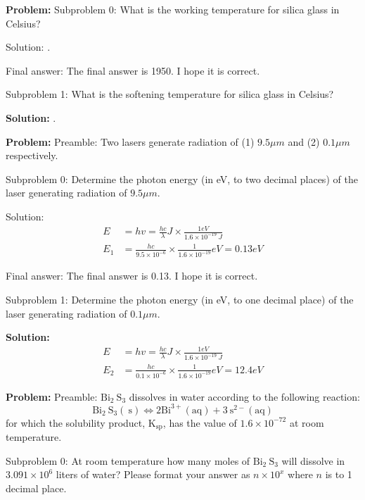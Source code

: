 \documentclass[10pt]{article}
\begin{document}
\textbf{Problem:}
Subproblem 0: What is the working temperature for silica glass in Celsius?


Solution: .

Final answer: The final answer is 1950. I hope it is correct.

Subproblem 1: What is the softening temperature for silica glass in Celsius?


\textbf{Solution:}
.


\textbf{Problem:}
Preamble: Two lasers generate radiation of (1) $9.5 \mu {m}$ and (2) $0.1 \mu {m}$ respectively.

Subproblem 0: Determine the photon energy (in eV, to two decimal places) of the laser generating radiation of $9.5 \mu {m}$.


Solution: \[
\begin{aligned}
{E} &={h} v=\frac{{hc}}{\lambda} {J} \times \frac{1 {eV}}{1.6 \times 10^{-19} {~J}} \\
{E}_{1} &=\frac{{hc}}{9.5 \times 10^{-6}} \times \frac{1}{1.6 \times 10^{-19}} {eV}= \boxed{0.13} {eV}
\end{aligned}
\]

Final answer: The final answer is 0.13. I hope it is correct.

Subproblem 1: Determine the photon energy (in eV, to one decimal place) of the laser generating radiation of $0.1 \mu {m}$. 


\textbf{Solution:}
\[
\begin{aligned}
{E} &={h} v=\frac{{hc}}{\lambda} {J} \times \frac{1 {eV}}{1.6 \times 10^{-19} {~J}} \\
{E}_{2} &=\frac{{hc}}{0.1 \times 10^{-6}} \times \frac{1}{1.6 \times 10^{-19}} {eV}= \boxed{12.4} {eV}
\end{aligned}
\]


\textbf{Problem:}
Preamble: $\mathrm{Bi}_{2} \mathrm{~S}_{3}$ dissolves in water according to the following reaction:
\[
\mathrm{Bi}_{2} \mathrm{~S}_{3}(\mathrm{~s}) \Leftrightarrow 2 \mathrm{Bi}^{3+}(\mathrm{aq})+3 \mathrm{~s}^{2-}(\mathrm{aq})
\]
for which the solubility product, $\mathrm{K}_{\mathrm{sp}}$, has the value of $1.6 \times 10^{-72}$ at room temperature.

Subproblem 0: At room temperature how many moles of $\mathrm{Bi}_{2} \mathrm{~S}_{3}$ will dissolve in $3.091 \times 10^{6}$ liters of water? Please format your answer as $n \times 10^x$ where $n$ is to 1 decimal place.
\end{document}
